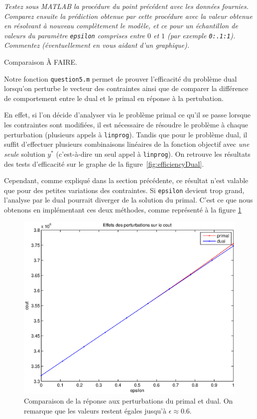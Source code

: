 \question %
\emph{Testez sous MATLAB la procédure du point précédent avec les données
fournies. Comparez ensuite la prédiction obtenue par cette procédure
avec la valeur obtenue en résolvant à nouveau complètement le modèle,
et ce pour un échantillon de valeurs du paramètre \texttt{epsilon} comprises
entre $0$ et $1$ (par exemple \texttt{0:.1:1}).
Commentez (éventuellement en vous aidant d'un graphique).}

Comparaison À FAIRE.

Notre fonction \texttt{question5.m} permet de prouver l'efficacité
du problème dual lorsqu'on perturbe le vecteur des contraintes
ainsi que de comparer la différence de comportement entre le dual
et le primal en réponse à la pertubation.

En effet, si l'on décide d'analyser via le problème primal ce qu'il
se passe lorsque les contraintes sont modifiées, il est nécessaire de
résoudre le problème à chaque perturbation
(plusieurs appels à \texttt{linprog}).
Tandis que pour le problème dual,
il suffit d'effectuer plusieurs combinaisons linéaires de la fonction objectif
avec \emph{une seule} solution $y^{*}$
(c'est-à-dire un seul appel à \texttt{linprog}).
On retrouve les résultats des tests d'efficacité
sur le graphe de la figure~\ref{fig:efficiencyDual}.

Cependant, comme expliqué dans la section précédente, ce résultat n'est valable que pour des petites variations des contraintes.
Si \texttt{epsilon} devient trop grand, l'analyse par le dual pourrait diverger de la solution du primal.
C'est ce que nous obtenons en implémentant ces deux méthodes, comme représenté à la figure \ref{fig:responseToPerturbations}

\begin{figure}
  \begin{center}
    \includegraphics[scale=0.6]{img/responseToPerturbations.eps}
    \caption{Comparaison de la réponse aux perturbations du primal
    et dual. On remarque que les valeurs restent égales jusqu'à
    $\epsilon \approx 0.6$.}
    \label{fig:responseToPerturbations}
  \end{center}
\end{figure}

